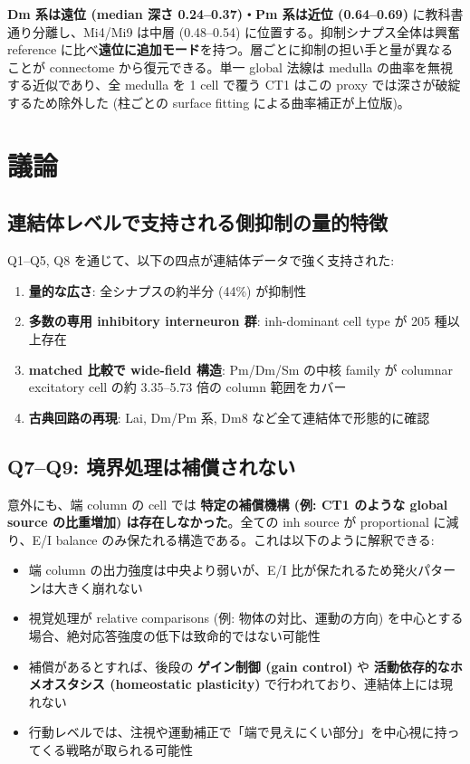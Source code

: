 \documentclass[11pt,a4paper]{ltjsarticle}
\begin{document}
\textbf{Dm 系は遠位 (median 深さ 0.24--0.37)・Pm 系は近位 (0.64--0.69)} に教科書通り分離し、Mi4/Mi9 は中層 (0.48--0.54) に位置する。抑制シナプス全体は興奮 reference に比べ\textbf{遠位に追加モード}を持つ。層ごとに抑制の担い手と量が異なることが connectome から復元できる。単一 global 法線は medulla の曲率を無視する近似であり、全 medulla を 1 cell で覆う CT1 はこの proxy では深さが破綻するため除外した (柱ごとの surface fitting による曲率補正が上位版)。

\section{議論}\label{sec:discussion}

\subsection{連結体レベルで支持される側抑制の量的特徴}

Q1--Q5, Q8 を通じて、以下の四点が連結体データで強く支持された:
\begin{enumerate}
\item \textbf{量的な広さ}: 全シナプスの約半分 (44\%) が抑制性
\item \textbf{多数の専用 inhibitory interneuron 群}: inh-dominant cell type が 205 種以上存在
\item \textbf{matched 比較で wide-field 構造}: Pm/Dm/Sm の中核 family が columnar excitatory cell の約 3.35--5.73 倍の column 範囲をカバー
\item \textbf{古典回路の再現}: Lai, Dm/Pm 系, Dm8 など全て連結体で形態的に確認
\end{enumerate}

\subsection{Q7--Q9: 境界処理は補償されない}

意外にも、端 column の cell では \textbf{特定の補償機構 (例: CT1 のような global source の比重増加) は存在しなかった}。全ての inh source が proportional に減り、E/I balance のみ保たれる構造である。これは以下のように解釈できる:

\begin{itemize}
\item 端 column の出力強度は中央より弱いが、E/I 比が保たれるため発火パターンは大きく崩れない
\item 視覚処理が relative comparisons (例: 物体の対比、運動の方向) を中心とする場合、絶対応答強度の低下は致命的ではない可能性
\item 補償があるとすれば、後段の \textbf{ゲイン制御 (gain control)} や \textbf{活動依存的なホメオスタシス (homeostatic plasticity)} で行われており、連結体上には現れない
\item 行動レベルでは、注視や運動補正で「端で見えにくい部分」を中心視に持ってくる戦略が取られる可能性
\end{itemize}
\end{document}
